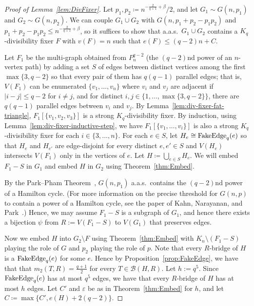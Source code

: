 \documentclass[11pt]{article}
\numberwithin{equation}{section}
\newcounter{i}
\theoremstyle{plain}
\theoremstyle{plain} %
\theoremstyle{definition}
\newcommand{\cB}{\mathcal{B}}
\newcommand{\aas}{a.a.s.\ }
\begin{document}
\begin{proof}[Proof of Lemma~\ref{lem:DivFixer}]
    
Let $p_1, p_2 \coloneqq n^{-\frac{2}{q+1} + \beta}/2$, and let $G_1 \sim G(n,p_1)$ and $G_2\sim G(n,p_2)$.  We can couple $G_1 \cup G_2$ with $G(n,p_1 + p_2 - p_1p_2)$ and $p_1 + p_2 - p_1p_2 \leq n^{-\frac{2}{q+1} + \beta}$, so it suffices to show that \aas $G_1 \cup G_2$ contains a $K_q$-divisibility fixer $F$ with $v(F)=n$ such that $e(F) \le (q-2)n + C$.

Let $F_1$ be the multi-graph obtained from $P_n^{q-2}$ (the $(q - 2)$nd power of an $n$-vertex path) by adding a set $S$ of edges between distinct vertices among the first $\max\{3, q - 2\}$ so that every pair of them has $q(q - 1)$ parallel edges; that is, $V(F_1)$ can be enumerated $\{v_1, \dots, v_n\}$ where $v_i$ and $v_j$ are adjacent if $|i - j| \leq q - 2$ for $i\neq j$, and for distinct $i, j \in \{1, \dots, \max\{3, q - 2\}\}$, there are $q(q - 1)$ parallel edges between $v_i$ and $v_j$.  By Lemma~\ref{lem:div-fixer-fat-triangle}, $F_1[\{v_1, v_2, v_3\}]$ is a strong $K_q$-divisibility fixer.  By induction, using Lemma~\ref{lem:div-fixer-inductive-step}, we have $F_1[\{v_1, \dots, v_i\}]$ is also a strong $K_q$-divisibility fixer for each $i \in \{3, \dots, n\}$.  
For each $e \in S$, let $H_e \cong {\rm FakeEdge}_q(e)$ so that $H_e$ and $H_{e'}$ are edge-disjoint for every distinct $e,e' \in S$ and $V(H_e)$ intersects $V(F_1)$ only in the vertices of $e$.  Let $H \coloneqq \bigcup_{e\in S}H_e$.  We will embed $F_1 - S$ in $G_1$ and embed $H$ in $G_2$ using Theorem~\ref{thm:Embed}.

By the Park--Pham Theorem~\cite{PP23}, $G(n,p_1)$ \aas contains the $(q - 2)$nd power of a Hamilton cycle. (For more information on the precise threshold for $G(n,p)$ to contain a power of a Hamilton cycle, see the paper of Kahn, Narayanan, and Park~\cite{KNP21}.)  Hence, we may assume $F_1 - S$ is a subgraph of $G_1$, and hence there exists a bijection $\psi$ from $R:=V(F_1-S)$ to $V(G_1)$ that preserves edges. 

Now we embed $H$ into $G_2 \setminus F$ using Theorem~\ref{thm:Embed} with $K_n \setminus (F_1 - S)$ playing the role of $G$ and $p_2$ playing the role of $p$.
Note that every $R$-bridge of $H$ is a ${\rm FakeEdge}_q(e)$ for some $e$. Hence by Proposition~\ref{prop:FakeEdge}, we have that that $m_2(T, R) = \frac{q+1}{2}$ for every $T \in \cB(H, R)$. 
Let $h:=q^5$. Since ${\rm FakeEdge}_q(e)$ has at most $q^5$ edges, we have that every $R$-bridge of $H$ has at most $h$ edges.  
Let $C'$ and $\varepsilon$ be as in Theorem~\ref{thm:Embed} for $h$, and let $C \coloneqq \max\{C', e(H) + 2(q-2)\}$.


\end{proof}
\end{document}
